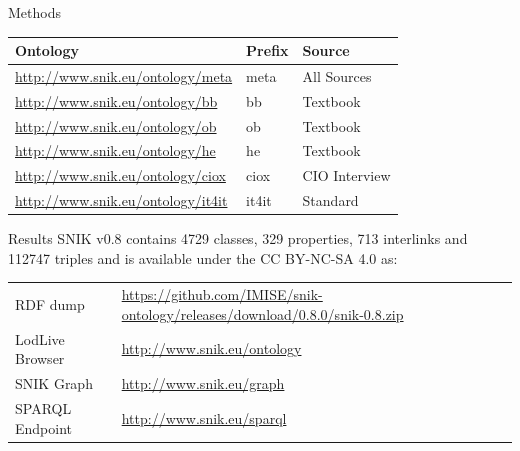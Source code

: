 \documentclass[portrait,final,a0paper,fontscale=0.310]{baposter}
\begin{document}
\begin{poster}
\begin{posterbox}[name=methods,below=background]{Methods}
\begin{center}
\begin{tabular*}{0.96\columnwidth}{lll}
\toprule
\textbf{Ontology}				&\textbf{Prefix}&\textbf{Source}\\
\midrule
\url{http://www.snik.eu/ontology/meta}		&meta		&All Sources\\
\url{http://www.snik.eu/ontology/bb}		&bb		&Textbook~\cite{bb}\\
\url{http://www.snik.eu/ontology/ob}		&ob		&Textbook~\cite{ob}\\
\url{http://www.snik.eu/ontology/he}		&he		&Textbook~\cite{he}\\
\url{http://www.snik.eu/ontology/ciox}		&ciox		&CIO Interview\\
\url{http://www.snik.eu/ontology/it4it}		&it4it		&Standard~\cite{it4it}\\
\bottomrule
\end{tabular*}
\end{center}

\end{posterbox}
\begin{posterbox}[name=results,column=1]{Results}
SNIK v0.8 contains \num{4729} classes, \num{329} properties, \num{713} interlinks and \num{112747} triples and is available under the CC BY-NC-SA 4.0 as:
\begin{tabulary}{\columnwidth}{lL}
\toprule
RDF dump	&\url{https://github.com/IMISE/snik-ontology/releases/download/0.8.0/snik-0.8.zip}\\
LodLive Browser	&\url{http://www.snik.eu/ontology}\\
SNIK Graph	&\url{http://www.snik.eu/graph}\\
SPARQL Endpoint	&\url{http://www.snik.eu/sparql}\\
\bottomrule
\end{tabulary}%


\end{posterbox}
\end{poster}
\end{document}
